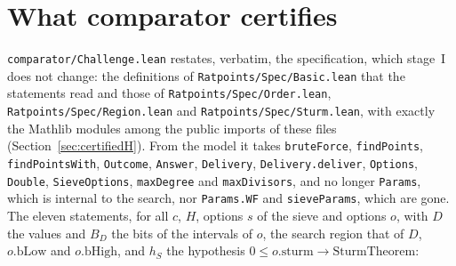 \section{What comparator certifies}\label{sec:certifiedI}

\verb|comparator/Challenge.lean| restates, verbatim, the specification, which stage~I does not
change: the definitions of \verb|Ratpoints/Spec/Basic.lean| that the statements read and those of
\verb|Ratpoints/Spec/Order.lean|, \verb|Ratpoints/Spec/Region.lean| and
\verb|Ratpoints/Spec/Sturm.lean|, with exactly the Mathlib modules among the public imports of these
files (Section~\ref{sec:certifiedH}). From the model it takes \verb|bruteForce|, \verb|findPoints|,
\verb|findPointsWith|, \verb|Outcome|, \verb|Answer|, \verb|Delivery|, \verb|Delivery.deliver|,
\verb|Options|, \verb|Double|, \verb|SieveOptions|, \verb|maxDegree| and \verb|maxDivisors|, and no
longer \verb|Params|, which is internal to the search, nor \verb|Params.WF| and \verb|sieveParams|,
which are gone. The eleven statements, for all $c$, $H$, options $s$ of the sieve and options $o$,
with $D$ the values and $B_D$ the bits of the intervals of $o$, the search region that of $D$,
$o.\mathrm{bLow}$ and $o.\mathrm{bHigh}$, and $h_S$ the hypothesis
$0 \le o.\mathrm{sturm} \to \mathrm{SturmTheorem}$:
